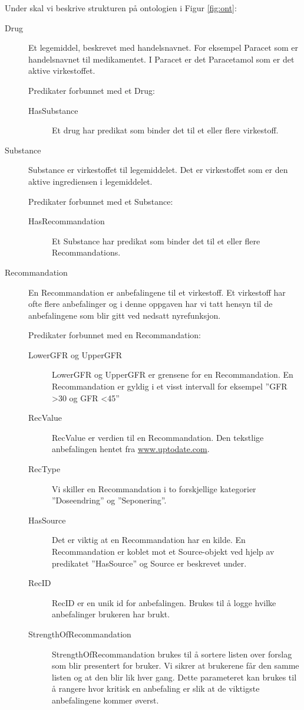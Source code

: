 Under skal vi beskrive strukturen på ontologien i Figur \ref{fig:ont}:
\begin{description}

\item[Drug]
Et legemiddel, beskrevet med handelsnavnet. For eksempel Paracet som er handelsnavnet til medikamentet. I Paracet er det Paracetamol som er det aktive virkestoffet.

Predikater forbunnet med et Drug:
\begin{description}
\item[HasSubstance]
Et drug har predikat som binder det til et eller flere virkestoff. 
\end{description}


\item[Substance]
Substance er virkestoffet til legemiddelet. Det er virkestoffet som er den aktive ingrediensen i legemiddelet.

Predikater forbunnet med et Substance:
\begin{description}
\item[HasRecommandation]
Et Substance har predikat som binder det til et eller flere Recommandations. 
\end{description}


\item[Recommandation]
En Recommandation er anbefalingene til et virkestoff. Et virkestoff har ofte flere anbefalinger og i denne oppgaven har vi tatt hensyn til de anbefalingene som blir gitt ved nedsatt nyrefunksjon. 

Predikater forbunnet med en Recommandation:
\begin{description}
\item[LowerGFR og UpperGFR]
LowerGFR og UpperGFR er grensene for en Recommandation. En Recommandation er gyldig i et visst intervall  for eksempel ''GFR \textgreater 30 og GFR \textless 45''
\item[RecValue]
RecValue er verdien til en Recommandation. Den tekstlige anbefalingen hentet fra \url{www.uptodate.com}.
\item[RecType]
Vi skiller en Recommandation i to forskjellige kategorier ''Doseendring'' og ''Seponering''.
\item[HasSource]
Det er viktig at en Recommandation har en kilde. En Recommandation er koblet mot et Source-objekt ved hjelp av predikatet ''HasSource'' og Source er beskrevet under.
\item[RecID]
RecID er en unik id for anbefalingen. Brukes til å logge hvilke anbefalinger brukeren har brukt.
\item[StrengthOfRecommandation]
StrengthOfRecommandation brukes til å sortere listen over forslag som blir presentert for bruker. Vi sikrer at brukerene får den samme listen og at den blir lik hver gang. Dette parameteret kan brukes til å rangere hvor kritisk en anbefaling er slik at de viktigste anbefalingene kommer øverst.


\end{description}
\end{description}
